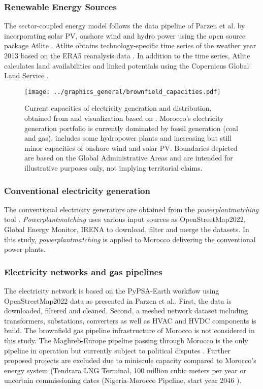 \subsubsection*{Renewable Energy Sources}
The sector-coupled energy model follows the data pipeline of Parzen et al.\cite{Parzen2023} by incorporating solar PV, onshore wind and hydro power using the open source package Atlite \cite{Hofmann2021}.
Atlite obtains technology-specific time series of the weather year 2013 based on the ERA5 reanalysis data \cite{Hersbach2020}. In addition to the time series, Atlite calculates land availabilities and linked potentials using the Copernicus Global Land Service \cite{Buchhorn2020}.


\begin{figure*}[t]
    \centering
    \texttt{[image: ../graphics\_general/brownfield\_capacities.pdf]}
    \caption{Current capacities of electricity generation and distribution, obtained from \cite{Parzen2022} and visualization based on \cite{Horsch2018}. Morocco's electricity generation portfolio is currently dominated by fossil generation (coal and gas), includes some hydropower plants and increasing but still minor capacities of onshore wind and solar PV. Boundaries depicted are based on the Global Administrative Areas and are intended for illustrative purposes only, not implying territorial claims.
    }
    \label{fig:MAR_brownfield}
\end{figure*}


\subsubsection*{Conventional electricity generation}
The conventional electricity generators are obtained from the \textit{powerplantmatching} tool \cite{Powerplantmatching2019}. \textit{Powerplantmatching} uses various input sources as OpenStreetMap2022, Global Energy Monitor, IRENA \cite{IRENA2022, OpenStreetMap2022, GlobalEnergyMonitor} to download, filter and merge the datasets. 
In this study, \textit{powerplantmatching} is applied to Morocco delivering the conventional power plants.

\subsubsection*{Electricity networks and gas pipelines}
The electricity network is based on the PyPSA-Earth workflow using OpenStreetMap2022 data \cite{OpenStreetMap2022} as presented in Parzen et al.\cite{Parzen2023}. First, the data is downloaded, filtered and cleaned. Second, a meshed network dataset including transformers, substations, converters as well as HVAC and HVDC components is build\cite{Parzen2023}. 
The brownfield gas pipeline infrastructure of Morocco is not considered in this study. The Maghreb-Europe pipeline passing through Morocco is the only pipeline in operation but currently subject to political disputes \cite{Rachidi2022}. Further proposed projects are excluded due to  miniscule capacity compared to Morocco's energy system (Tendrara LNG Terminal, 100 million cubic meters per year or uncertain commissioning dates (Nigeria-Morocco Pipeline, start year 2046 \cite{GEM2023b}).


